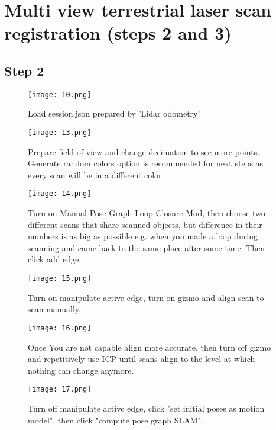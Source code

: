 \chapter{Multi view terrestrial laser scan registration (steps 2 and 3)}
\section{Step 2}
\begin{figure}
	\centering
	\texttt{[image: 10.png]}
	\caption{Load session.json prepared by 'Lidar odometry'.}
	\label{fig:10}
\end{figure}

\begin{figure}[H]
	\centering
	\texttt{[image: 13.png]}
	\caption{Prepare field of view and change decimation to see more points. Generate random colors option is recommended for next steps as every scan will be in a different color.}
	\label{fig:13}
\end{figure}

\begin{figure}[H]
	\centering
	\texttt{[image: 14.png]}
	\caption{Turn on Manual Pose Graph Loop Closure Mod, then choose two different scans that share scanned objects, but difference in their numbers is as big as possible e.g. when you made a loop during scanning and came back to the same place after some time. Then click add edge.} 
	\label{fig:14}
\end{figure}

\begin{figure}[H]
	\centering
	\texttt{[image: 15.png]}
	\caption{Turn on manipulate active edge, turn on gizmo and align scan to scan manually.}
	\label{fig:15}
\end{figure}

\begin{figure}[H]
	\centering
	\texttt{[image: 16.png]}
	\caption{Once You are not capable align more accurate, then turn off gizmo and repetitively use ICP until scans align to the level at which nothing can change anymore.}
	\label{fig:16}
\end{figure}

\begin{figure}[H]
	\centering
	\texttt{[image: 17.png]}
	\caption{Turn off manipulate active edge, click "set initial poses as motion model", then click "compute pose graph SLAM".}
	\label{fig:17}
\end{figure}

